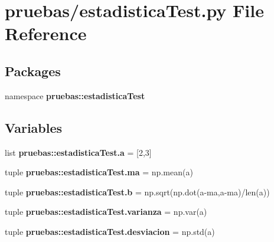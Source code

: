 \section{pruebas/estadistica\-Test.py \-File \-Reference}
\label{estadistica_test_8py}
\subsection*{\-Packages}
\begin{DoxyCompactItemize}
\item 
namespace {\bf pruebas\-::estadistica\-Test}
\end{DoxyCompactItemize}
\subsection*{\-Variables}
\begin{DoxyCompactItemize}
\item 
list {\bf pruebas\-::estadistica\-Test.\-a} = [2,3]
\item 
tuple {\bf pruebas\-::estadistica\-Test.\-ma} = np.\-mean(a)
\item 
tuple {\bf pruebas\-::estadistica\-Test.\-b} = np.\-sqrt(np.\-dot(a-\/ma,a-\/ma)/len(a))
\item 
tuple {\bf pruebas\-::estadistica\-Test.\-varianza} = np.\-var(a)
\item 
tuple {\bf pruebas\-::estadistica\-Test.\-desviacion} = np.\-std(a)
\end{DoxyCompactItemize}
